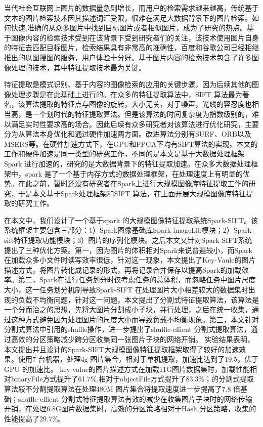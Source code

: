 ﻿\begin{cabstract}
当代社会互联网上图片的数据量急剧增长，而用户的检索需求越来越高，传统基于文本的图片检索技术因其描述词汇受限，很难在满足大数据背景下的图片检索。如何快速,准确的从众多图片中找到目标图片或者相似图片，成为了研究的热点。基于图像内容的检索技术受到在该背景下受到研究者们的关注，该技术使用图片自身的特征去匹配目标图片，检索结果具有非常高的准确性，百度和谷歌公司已经相继推出的以图搜图的服务，用户体验十分好。基于图片内容的检索技术包含了许多图像处理的技术，其中特征提取技术最为关键。

特征提取是模式识别、基于内容的图像检索的应用的关键步骤，因为后续其他的图像处理步骤是在此基础上进行的。在众多的特征提取算法中，SIFT 算法最为著名，该算法提取的特征点与图像的旋转，大小无关，对于噪声，光线的容忍度也相当高，是一个划时代的特征提取算法。但是该算法的时间复杂度为指数级别的，难以满足实时性要求高的场合。因此后续有众多研究者对该算法进行优化研究，主要分为从算法本身优化和通过硬件加速两方面。改进算法分别有SURF、ORB以及MSERS等。在硬件加速方式下，在GPU和FPGA下均有SIFT算法的实现。本文的工作和硬件加速是同一类型的研究工作，不同的是本文是基于大数据处理框架Spark 进行加速的，研究的是大数据背景下的特征提取加速。在众多大数据处理框架中，spark 是了一个基于内存方式的数据处理框架，在处理速度上有明显的优势。在此之前，暂时还没有研究者在Spark上进行大规模图像库特征提取工作的研究，于是本文基于Spark处理框架和SIFT 算法，在上面开展大规模图像库特征提取的研究工作。

在本文中，我们设计了一个基于spark 的大规模图像特征提取系统Spark-SIFT。该系统框架主要包含三部分：1）Spark图像基础库Spark-imageLib模块；2）Spark-sift特征提取功能模块；3）图片的序列化模块。之后本文又针对Spark-SIFT系统提出了三种优化方案。第一，因为图片的体积相对Spark来说普遍较小，而Spark在加载众多小文件时读写效率很低，针对这一现象，本文提出了Key-Vaule的图片描述方式，将图片转化成记录的形式，再将记录合并保存以提高Spark的加载效率。第二，Spark在进行任务划分时仅考虑任务的总体积，而忽略任务中图片尺度大小，这一任务划分机制导致Spark-SIFT 在处理图片大小相差较大的数据集时出现的负载不均衡问题，针对这一问题，本文提出了分割式特征提取算法，该算法是一个分而治之的思想，先将大图片分割成小子块，并行处理，之后在统一收集，通过这种方式避免因为处理图片的尺度大小而导致负载不均衡现象。第三，本文针对分割式算法中引用的shuffle操作，进一步提出了shuffle-effient 分割式提取算法，通过高效的分区策略减少跨分区收集同一张图片子块的网络开销。 实验结果表明，本文提出并且设计的Spark-SIFT大规模图像特征提取框架取得了较好的加速效果。使用7 台机器，处理4g 图片集合，相对于单机提取，加速比达到了19.5，优于GPU 的加速比。 key-value的图片描述方式在加载11G图片数据集时，加载性能相对binaryFile方式提升了61.7\%,相对于objectFile方式提升了83.3\%；的分割式提取算法较不分割提取算法在处理480M 图片集合将提取速度进一步提高了7.8 倍基础；shuffle-effient 分割式特征提取算法有效的减少在收集图片子块时的网络传输开销，在处理6.8G图片数据集时，高效的分区策略相对于Hash 分区策略，收集的性能提高了29.7\%。
\end{cabstract}

